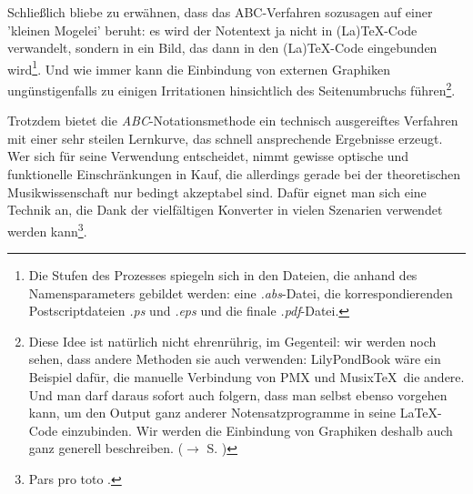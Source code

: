 Schließlich bliebe zu erwähnen, dass das ABC-Verfahren sozusagen auf einer
'kleinen Mogelei' beruht: es wird der Notentext ja nicht in (La)\TeX-Code
verwandelt, sondern in ein Bild, das dann in den (La)\TeX-Code eingebunden
wird\footnote{Die Stufen des Prozesses spiegeln sich in den Dateien, die anhand
des Namensparameters gebildet werden: eine \emph{.abs}-Datei, die
korrespondierenden Postscriptdateien \emph{.ps} und \emph{.eps} und die finale
\emph{.pdf}-Datei.}. Und wie immer kann die Einbindung von externen Graphiken
ungünstigenfalls zu einigen Irritationen hinsichtlich des Seitenumbruchs
führen\footnote{Diese Idee ist natürlich nicht ehrenrührig, im Gegenteil: wir
werden noch sehen, dass andere Methoden sie auch verwenden: LilyPondBook wäre
ein Beispiel dafür, die manuelle Verbindung von PMX und Musix\TeX\ die andere.
Und man darf daraus sofort auch folgern, dass man selbst ebenso vorgehen kann,
um den Output ganz anderer Notensatzprogramme in seine \LaTeX-Code einzubinden.
Wir werden die Einbindung von Graphiken deshalb auch ganz generell beschreiben.
($\rightarrow$ S. \pageref{IncludeGraphics})}.

Trotzdem bietet die \emph{ABC}-Notationsmethode ein technisch ausgereiftes
Verfahren mit einer sehr steilen Lernkurve, das schnell ansprechende Ergebnisse
erzeugt. Wer sich für seine Verwendung entscheidet, nimmt gewisse optische und
funktionelle Einschränkungen in Kauf, die allerdings gerade bei der
theoretischen Musikwissenschaft nur bedingt akzeptabel sind.
Dafür eignet man sich eine Technik an, die Dank der vielfältigen Konverter in
vielen Szenarien verwendet werden kann\footnote{Pars pro toto
\cite[vgl.][\nopage wp]{Rosen2018a}.}.
% 
